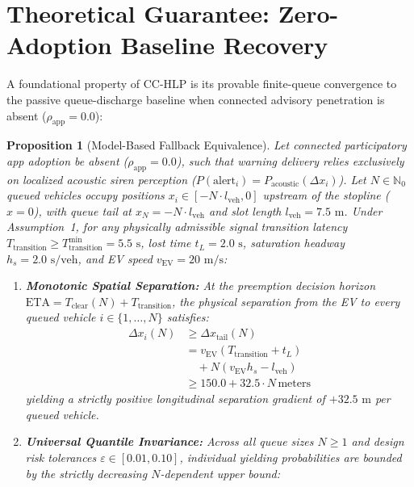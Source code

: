 \documentclass[journal,10pt,twocolumn]{IEEEtran}
\newtheorem{proposition}{Proposition}
\begin{document}
\section{Theoretical Guarantee: Zero-Adoption Baseline Recovery}
\label{sec:zero_adoption_lemma}

A foundational property of CC-HLP is its provable finite-queue convergence to the passive queue-discharge baseline when connected advisory penetration is absent ($\rho_{\text{app}} = 0.0$):

\begin{proposition}[Model-Based Fallback Equivalence]
\label{prop:zero_adoption}
Let connected participatory app adoption be absent ($\rho_{\text{app}} = 0.0$), such that warning delivery relies exclusively on localized acoustic siren perception ($P(\text{alert}_i) = P_{\text{acoustic}}(\Delta x_i)$). 
Let $N \in \mathbb{N}_0$ queued vehicles occupy positions $x_i \in [-N \cdot l_{\text{veh}}, 0]$ upstream of the stopline ($x = 0$), with queue tail at $x_N = -N \cdot l_{\text{veh}}$ and slot length $l_{\text{veh}} = 7.5\text{ m}$.
Under Assumption~1, for any physically admissible signal transition latency $T_{\text{transition}} \ge T_{\text{transition}}^{\min} = 5.5\text{ s}$, lost time $t_L = 2.0\text{ s}$, saturation headway $h_s = 2.0\text{ s/veh}$, and EV speed $v_{\text{EV}} = 20\text{ m/s}$:
\begin{enumerate}
    \item \textbf{Monotonic Spatial Separation:} At the preemption decision horizon $\text{ETA} = T_{\text{clear}}(N) + T_{\text{transition}}$, the physical separation from the EV to every queued vehicle $i \in \{1, \dots, N\}$ satisfies:
    \begin{align}
    \Delta x_i(N) &\ge \Delta x_{\text{tail}}(N) \nonumber \\[2pt]
    &= v_{\text{EV}} (T_{\text{transition}} + t_L) \nonumber \\[2pt]
    &\quad + N (v_{\text{EV}} h_s - l_{\text{veh}}) \nonumber \\[2pt]
    &\ge 150.0 + 32.5 \cdot N\,\text{meters}
    \end{align}
    yielding a strictly positive longitudinal separation gradient of $+32.5\text{ m}$ per queued vehicle.
    \item \textbf{Universal Quantile Invariance:} Across all queue sizes $N \ge 1$ and design risk tolerances $\varepsilon \in [0.01, 0.10]$, individual yielding probabilities are bounded by the strictly decreasing $N$-dependent upper bound:
    \begin{equation}

\end{equation}
\end{enumerate}
\end{proposition}
\end{document}
